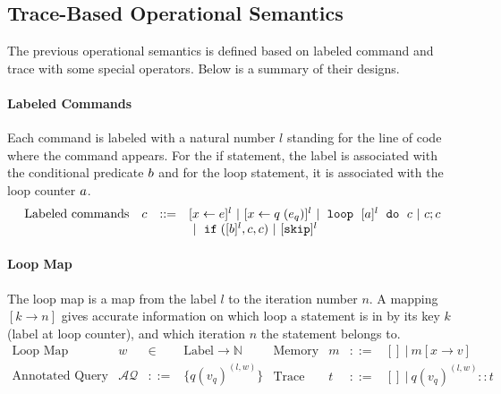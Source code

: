 \subsection{Trace-Based Operational Semantics}
The previous operational semantics is defined based on labeled command and trace with some special operators.
Below is a summary of their designs.

\paragraph*{Labeled Commands}
Each command is labeled with
a natural number $l$ standing for the line of code where the command appears.
For the if statement, the label is associated with the conditional predicate $b$
and for the loop statement, it is associated with the loop counter $a$.
\[
\begin{array}{llll}
 \mbox{Labeled commands} & c & ::= & [\mathrel{ x \leftarrow e }]^{l} ~|~ [\mathrel{ x \leftarrow q }(e_q)]^{l}
 ~|~ \;\mathtt{loop}\; ~ [a]^{l} ~ \;\mathtt{do}\; ~ c ~|~ c;c \\
 & & & ~|~ \;\mathtt{if}\;([b]^l, c, c) ~|~ [\mathtt{skip}]^{l} \\
\end{array}
\]
\paragraph*{Loop Map}
The loop map is a map from the label $l$ to the iteration number $n$.
 A mapping $[k \to n]$ gives accurate information on which loop a statement is in by its key $k$ (label at loop counter),
 and which iteration $n$ the statement belongs to.
\[
\begin{array}{llll}
 \mbox{Loop Map} & w & \in & \mbox{Label} \to \mathbb{N} \\
\mbox{Annotated Query} & \mathcal{AQ} & ::= & \{ q(v_q)^{(l,w)} \} \\
\end{array}
\begin{array}{llll}
 \mbox{Memory} & m & ::= & [] ~|~ m[x \to v] \\
\mbox{Trace} & t & ::= & [] ~|~ q(v_q)^{(l, w) } :: t \\
\end{array}
\]
